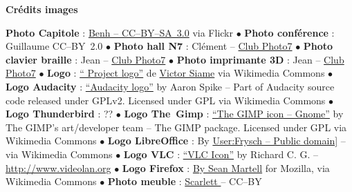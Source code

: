 
\vfill
\begin{center}
\textcolor{Cdl}{\textbf{Crédits images}} \par
{\tiny
 \textbf{Photo Capitole} : \href{https://www.flickr.com/photos/blieusong/6986608500/in/set-72157629942158013}{Benh  -- CC--BY--SA~3.0} via Flickr  \textcolor{Cdl}{$\bullet$}
 \textbf{Photo conférence } : Guillaume  CC--BY~2.0 \textcolor{Cdl}{$\bullet$}
 \textbf{Photo hall N7} : Clément  -- \href{http://www.bde.enseeiht.fr/clubs/photo/}{Club Photo7} \textcolor{Cdl}{$\bullet$}
 \textbf{Photo clavier braille} : Jean  -- \href{http://www.bde.enseeiht.fr/clubs/photo/}{Club Photo7} \textcolor{Cdl}{$\bullet$}
 \textbf{Photo imprimante 3D} : Jean  -- \href{http://www.bde.enseeiht.fr/clubs/photo/}{Club Photo7} \textcolor{Cdl}{$\bullet$}
 \textbf{Logo } : \href{https://commons.wikimedia.org/wiki/File\%3AOfficial_gnu.svg}{“ Project logo”} de \href{mailto:vcopovi@wanadoo.fr}{Victor Siame} via Wikimedia Commons \textcolor{Cdl}{$\bullet$}
 \textbf{Logo Audacity} : \href{https://commons.wikimedia.org/wiki/File:Audacity_Logo.svg#/media/File:Audacity_Logo.svg}{“Audacity logo”} by Aaron Spike -- Part of Audacity source code released under GPLv2. Licensed under GPL via Wikimedia Commons \textcolor{Cdl}{$\bullet$}
 \textbf{Logo Thunderbird} : ?? \textcolor{Cdl}{$\bullet$}
 \textbf{Logo The~Gimp} : \href{https://commons.wikimedia.org/wiki/File:The_GIMP_icon_-_gnome.svg#/media/File:The_GIMP_icon_-_gnome.svg}{“The GIMP icon -- Gnome”} by The GIMP's art/developer team -- The GIMP package. Licensed under GPL via Wikimedia Commons \textcolor{Cdl}{$\bullet$}
 \textbf{Logo LibreOffice} : By \href{https://commons.wikimedia.org/wiki/File\%3ALogo-libreoffice.svg}{User:Frysch -- Public domain]} -- via Wikimedia Commons \textcolor{Cdl}{$\bullet$}
 \textbf{Logo VLC} : \href{https://commons.wikimedia.org/wiki/File:VLC_Icon.svg#/media/File:VLC_Icon.svg}{“VLC Icon”} by Richard C. G.  -- \url{http://www.videolan.org} \textcolor{Cdl}{$\bullet$}
 \textbf{Logo Firefox} : \href{https://commons.wikimedia.org/wiki/File\%3AMozilla_Firefox_logo_2013.svg}{By Sean Martell} for Mozilla, via Wikimedia Commons \textcolor{Cdl}{$\bullet$}
 \textbf{Photo meuble} : \href{https://www.opendesk.cc/fin/fin-lockers}{Scarlett } -- CC--BY

}
\end{center}
